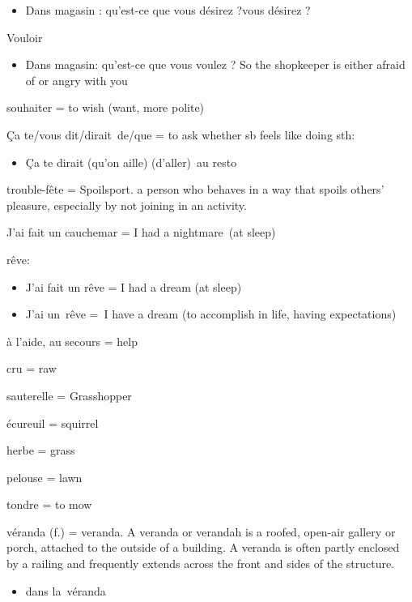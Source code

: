 \begin{itemize}
\item
  Dans magasin : qu'est-ce que vous désirez ?vous désirez ?
\end{itemize}

Vouloir~

\begin{itemize}
\item
  Dans magasin: qu'est-ce que vous voulez ? So the shopkeeper is either
  afraid of or angry with you~
\end{itemize}

souhaiter = to wish (want, more polite)

Ça te/vous dit/dirait~de/que = to ask whether sb feels like doing sth:

\begin{itemize}
\item
  Ça te dirait (qu'on aille) (d'aller)~au resto
\end{itemize}

trouble-fête = Spoilsport. a person who behaves in a way that spoils
others' pleasure, especially by not joining in an activity.

J'ai fait un cauchemar = I had a nightmare~(at sleep)

rêve:~

\begin{itemize}
\item
  J'ai fait un rêve = I had a dream (at sleep)
\item
  J'ai un~rêve =~I have a dream (to accomplish in life, having
  expectations)
\end{itemize}

à l'aide, au secours = help

cru = raw

sauterelle = Grasshopper

écureuil = squirrel

herbe = grass

pelouse = lawn

tondre = to mow

véranda (f.) = veranda. A veranda or verandah is a roofed, open-air
gallery or porch, attached to the outside of a building. A veranda is
often partly enclosed by a railing and frequently extends across the
front and sides of the structure.

\begin{itemize}
\item
  {dans} la~véranda
\end{itemize}

